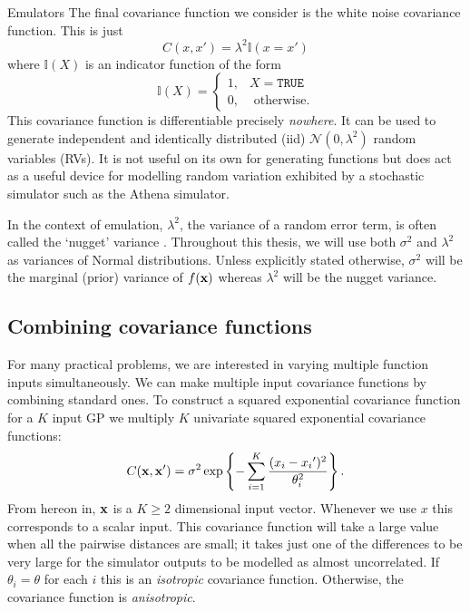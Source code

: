 \begin{chapter}{Emulators \label{Ch:Emulators}}
The final covariance function we consider is the white noise covariance function. This is just
\begin{equation}
  C(x, x') = \lambda^2 \mathbb{I}(x = x')
\end{equation}
where $\mathbb{I}(X)$ is an indicator function of the form
\begin{equation}
  \mathbb{I}(X) = \begin{cases}
    1, & X = \texttt{TRUE}\\
    0, & \text{ otherwise.}
  \end{cases}
\end{equation}
This covariance function is differentiable precisely \textit{nowhere}. It can be used to generate independent and identically distributed (iid) $\mathcal{N}(0, \lambda^2)$ random variables (RVs). It is not useful on its own for generating functions but does act as a useful device for modelling random variation exhibited by a stochastic simulator such as the Athena simulator.

In the context of emulation, $\lambda^2$, the variance of a random error term, is often called the `nugget' variance \citep{Gramacy12}. Throughout this thesis, we will use both $\sigma^2$ and $\lambda^2$ as variances of Normal distributions. Unless explicitly stated otherwise, $\sigma^2$ will be the marginal (prior) variance of $f(\mathbf{x})$ whereas $\lambda^2$ will be the nugget variance.

\subsection{Combining covariance functions}

For many practical problems, we are interested in varying multiple function inputs simultaneously. We can make multiple input covariance functions by combining standard ones. To construct a squared exponential covariance function for a $K$ input GP we multiply $K$ univariate squared exponential covariance functions:
\begin{equation}
C(\mathbf{x}, \mathbf{x}') = \sigma^2 \exp\left\{ - \sum_{i = 1}^K \frac{(x_i - {x_i}')^2}{\theta_i^2}\right\}.
\end{equation}
From hereon in, $\mathbf{x}$ is a $K \geq 2$ dimensional input vector. Whenever we use $x$ this corresponds to a scalar input. This covariance function will take a large value when all the pairwise distances are small; it takes just one of the differences to be very large for the simulator outputs to be modelled as almost uncorrelated. If $\theta_i = \theta$ for each $i$ this is an \textit{isotropic} covariance function. Otherwise, the covariance function is \textit{anisotropic}.


\end{chapter}
